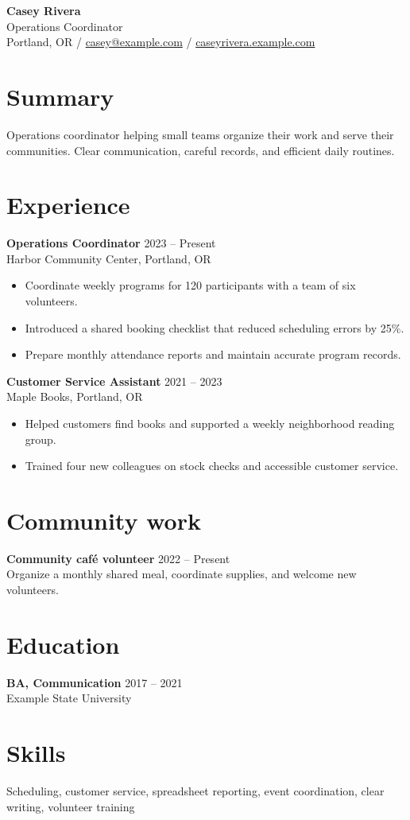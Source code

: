 \documentclass[11pt,a4paper]{article}
\begin{document}
{\LARGE\bfseries Casey Rivera}\\[5pt]
Operations Coordinator\\[5pt]
Portland, OR \enspace / \enspace
\href{mailto:casey@example.com}{casey@example.com} \enspace / \enspace
\href{https://example.com}{caseyrivera.example.com}

\section{Summary}
Operations coordinator helping small teams organize their work and serve their
communities. Clear communication, careful records, and efficient daily routines.

\section{Experience}
\textbf{Operations Coordinator} \hfill 2023 -- Present\\
Harbor Community Center, Portland, OR
\begin{itemize}
  \item Coordinate weekly programs for 120 participants with a team of six volunteers.
  \item Introduced a shared booking checklist that reduced scheduling errors by 25\%.
  \item Prepare monthly attendance reports and maintain accurate program records.
\end{itemize}
\textbf{Customer Service Assistant} \hfill 2021 -- 2023\\
Maple Books, Portland, OR
\begin{itemize}
  \item Helped customers find books and supported a weekly neighborhood reading group.
  \item Trained four new colleagues on stock checks and accessible customer service.
\end{itemize}

\section{Community work}
\textbf{Community caf\'e volunteer} \hfill 2022 -- Present\\
Organize a monthly shared meal, coordinate supplies, and welcome new volunteers.

\section{Education}
\textbf{BA, Communication} \hfill 2017 -- 2021\\
Example State University

\section{Skills}
Scheduling, customer service, spreadsheet reporting, event coordination,
clear writing, volunteer training
\end{document}
